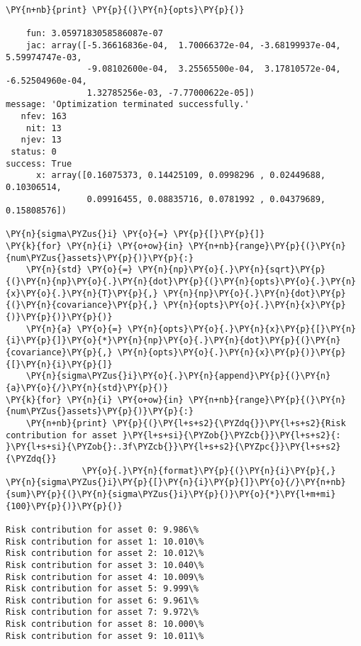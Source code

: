 \begin{Answer}
\begin{tcolorbox}[size=fbox, boxrule=1pt, colback=cellbackground, colframe=cellborder]
\begin{Verbatim}[commandchars=\\\{\}]
\PY{n+nb}{print} \PY{p}{(}\PY{n}{opts}\PY{p}{)}

    fun: 3.0597183058586087e-07
    jac: array([-5.36616836e-04,  1.70066372e-04, -3.68199937e-04, 5.59974747e-03, 
                -9.08102600e-04,  3.25565500e-04,  3.17810572e-04, -6.52504960e-04,  
                1.32785256e-03, -7.77000622e-05])
message: 'Optimization terminated successfully.'
   nfev: 163
    nit: 13
   njev: 13
 status: 0
success: True
      x: array([0.16075373, 0.14425109, 0.0998296 , 0.02449688, 0.10306514,
                0.09916455, 0.08835716, 0.0781992 , 0.04379689, 0.15808576])

\PY{n}{sigma\PYZus{}i} \PY{o}{=} \PY{p}{[}\PY{p}{]}
\PY{k}{for} \PY{n}{i} \PY{o+ow}{in} \PY{n+nb}{range}\PY{p}{(}\PY{n}{num\PYZus{}assets}\PY{p}{)}\PY{p}{:}
    \PY{n}{std} \PY{o}{=} \PY{n}{np}\PY{o}{.}\PY{n}{sqrt}\PY{p}{(}\PY{n}{np}\PY{o}{.}\PY{n}{dot}\PY{p}{(}\PY{n}{opts}\PY{o}{.}\PY{n}{x}\PY{o}{.}\PY{n}{T}\PY{p}{,} \PY{n}{np}\PY{o}{.}\PY{n}{dot}\PY{p}{(}\PY{n}{covariance}\PY{p}{,} \PY{n}{opts}\PY{o}{.}\PY{n}{x}\PY{p}{)}\PY{p}{)}\PY{p}{)} 
    \PY{n}{a} \PY{o}{=} \PY{n}{opts}\PY{o}{.}\PY{n}{x}\PY{p}{[}\PY{n}{i}\PY{p}{]}\PY{o}{*}\PY{n}{np}\PY{o}{.}\PY{n}{dot}\PY{p}{(}\PY{n}{covariance}\PY{p}{,} \PY{n}{opts}\PY{o}{.}\PY{n}{x}\PY{p}{)}\PY{p}{[}\PY{n}{i}\PY{p}{]} 
    \PY{n}{sigma\PYZus{}i}\PY{o}{.}\PY{n}{append}\PY{p}{(}\PY{n}{a}\PY{o}{/}\PY{n}{std}\PY{p}{)}
\PY{k}{for} \PY{n}{i} \PY{o+ow}{in} \PY{n+nb}{range}\PY{p}{(}\PY{n}{num\PYZus{}assets}\PY{p}{)}\PY{p}{:}
	\PY{n+nb}{print} \PY{p}{(}\PY{l+s+s2}{\PYZdq{}}\PY{l+s+s2}{Risk contribution for asset }\PY{l+s+si}{\PYZob{}\PYZcb{}}\PY{l+s+s2}{: }\PY{l+s+si}{\PYZob{}:.3f\PYZcb{}}\PY{l+s+s2}{\PYZpc{}}\PY{l+s+s2}{\PYZdq{}}
               \PY{o}{.}\PY{n}{format}\PY{p}{(}\PY{n}{i}\PY{p}{,} \PY{n}{sigma\PYZus{}i}\PY{p}{[}\PY{n}{i}\PY{p}{]}\PY{o}{/}\PY{n+nb}{sum}\PY{p}{(}\PY{n}{sigma\PYZus{}i}\PY{p}{)}\PY{o}{*}\PY{l+m+mi}{100}\PY{p}{)}\PY{p}{)}

Risk contribution for asset 0: 9.986\%
Risk contribution for asset 1: 10.010\%
Risk contribution for asset 2: 10.012\%
Risk contribution for asset 3: 10.040\%
Risk contribution for asset 4: 10.009\%
Risk contribution for asset 5: 9.999\%
Risk contribution for asset 6: 9.961\%
Risk contribution for asset 7: 9.972\%
Risk contribution for asset 8: 10.000\%
Risk contribution for asset 9: 10.011\%		
\end{Verbatim}
\end{tcolorbox}
\end{Answer}

